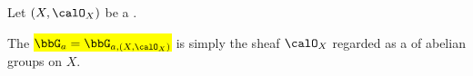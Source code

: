 \begin{definition} \label{definition:additive_group_sheaf_on_a_ringed_space}
    Let $(X, \calO_X)$ be a .

    The  \hl{$\bbG_a = \bbG_{a,(X, \calO_X)}$} is simply the sheaf $\calO_X$ regarded as a  of abelian groups on $X$.
\end{definition}